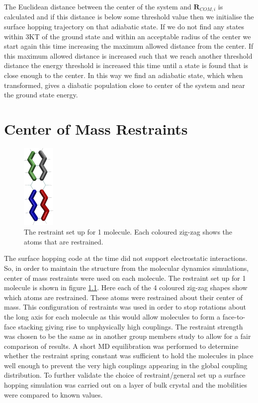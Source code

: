 The Euclidean distance between the center of the system and $\mathbf{R}_{COM, i}$ is calculated and if this distance is below some threshold value then we initialise the surface hopping trajectory on that adiabatic state. If we do not find any states within 3KT of the ground state and within an acceptable radius of the center we start again this time increasing the maximum allowed distance from the center. If this maximum allowed distance is increased such that we reach another threshold distance the energy threshold is increased this time until a state is found that is close enough to the center. In this way we find an adiabatic state, which when transformed, gives a diabatic population close to center of the system and near the ground state energy.



\chapter{Center of Mass Restraints}
\label{ap:Restraints}
\begin{figure}
    \vspace*{-0.7cm}
    \centering
    \includegraphics[width=0.14\textwidth]{./img/RestraintsPos.png}
    \caption{\label{fig:rest}The restraint set up for 1 molecule. Each coloured zig-zag shows the atoms that are restrained.}
\end{figure}
The surface hopping code at the time did not support electrostatic interactions. So, in order to maintain the structure from the molecular dynamics simulations, center of mass restraints were used on each molecule. The restraint set up for 1 molecule is shown in figure \ref{fig:rest}. Here each of the 4 coloured zig-zag shapes show which atoms are restrained. These atoms were restrained about their center of mass. This configuration of restraints was used in order to stop rotations about the long axis for each molecule as this would allow molecules to form a face-to-face stacking giving rise to unphysically high couplings. The restraint strength was chosen to be the same as in another group members study to allow for a fair comparison of  results. A short MD equilibration was performed to determine whether the restraint spring constant was sufficient to hold the molecules in place well enough to prevent the very high couplings appearing in the global coupling    distribution. To further validate the choice of restraint/general set up a surface hopping simulation was carried out on a layer of bulk crystal and the mobilities were compared to known values.

